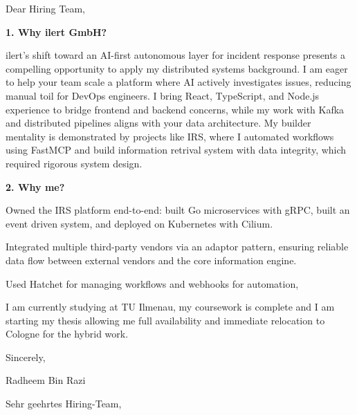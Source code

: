 \documentclass[11pt,a4paper]{coverletter}
\begin{document}

\opening{Dear Hiring Team,}

\vspace{8pt}\noindent\textbf{1. Why ilert GmbH?}\par\vspace{3pt}

ilert's shift toward an AI-first autonomous layer for incident response presents a compelling opportunity to apply my distributed systems background. I am eager to help your team scale a platform where AI actively investigates issues, reducing manual toil for DevOps engineers. I bring React, TypeScript, and Node.js experience to bridge frontend and backend concerns, while my work with Kafka and distributed pipelines aligns with your data architecture. My builder mentality is demonstrated by projects like IRS, where I automated workflows using FastMCP and build  information retrival system with data integrity, which required rigorous system design.

\vspace{8pt}\noindent\textbf{2. Why me?}\par\vspace{3pt}

\bullets

  \item Owned the IRS platform end-to-end: built Go microservices with gRPC, built an event driven system, and deployed on Kubernetes with Cilium.

  \item Integrated multiple third-party vendors via an adaptor pattern, ensuring reliable data flow between external vendors and the core information engine.

  \item Used Hatchet for managing workflows and webhooks for automation,

\bulletsend

I am currently studying at TU Ilmenau, my coursework is complete and I am starting my thesis allowing me full availability and immediate relocation to Cologne for the hybrid work.

\closing{Sincerely,}{Radheem Bin Razi}

\clearpage
{}


\opening{Sehr geehrtes Hiring-Team,}
\end{document}
